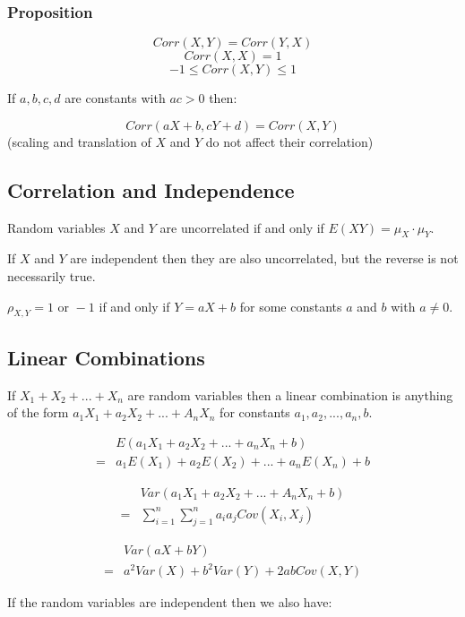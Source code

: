 \subsubsection*{Proposition}

$$ Corr(X,Y) = Corr(Y,X) $$
$$ Corr(X,X) = 1 $$
$$ -1 \leq Corr(X,Y) \leq 1 $$

If $a,b,c,d$ are constants with $ac>0$ then:

$$ Corr(aX+b, cY+d) = Corr(X,Y) $$
(scaling and translation of $X$ and $Y$ do not affect their correlation)

\subsection*{Correlation and Independence}

Random variables $X$ and $Y$ are uncorrelated if and only if $E(XY)=\mu_X\cdot \mu_Y$.

If $X$ and $Y$ are independent then they are  also uncorrelated, but the reverse is not necessarily true.

$\rho_{X,Y} = 1 \text{ or } -1$ if and only if $Y=aX+b$ for some constants $a$ and $b$ with $a\neq 0$.

\subsection*{Linear Combinations}

If $X_1+X_2+...+X_n$ are random variables then a linear combination is anything of the form $a_1X_1+a_2X_2+...+A_nX_n$ for constants $a_1,a_2,...,a_n,b$.

\begin{align*}
    & E(a_1X_1+a_2X_2+...+a_nX_n+b)       \\
  = & a_1E(X_1)+a_2E(X_2)+...+a_nE(X_n)+b
\end{align*}

\begin{align*}
    & Var(a_1X_1+a_2X_2+...+A_nX_n+b)                \\
  = & \sum_{i=1}^n \sum_{j=1}^n a_i a_j Cov(X_i,X_j)
\end{align*}

\begin{align*}
    & Var(aX+bY)                             \\
  = & a^2 Var(X) + b^2 Var(Y) + 2ab Cov(X,Y)
\end{align*}

If the random variables are independent then we also have:

